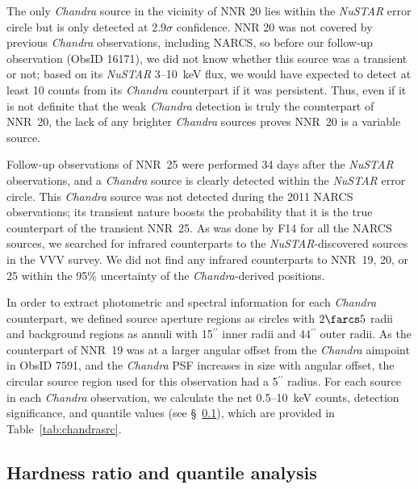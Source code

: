 \documentclass[iop,revtex4]{emulateapj}
\begin{document}
The only \textit{Chandra} source in the vicinity of NNR 20 lies within the \textit{NuSTAR} error circle but is only detected at 2.9$\sigma$ confidence.  NNR 20 was not covered by previous \textit{Chandra} observations, including NARCS, so before our follow-up observation (ObsID 16171), we did not know whether this source was a transient or not; based on its \textit{NuSTAR} 3--10~keV flux, we would have expected to detect at least 10 counts from its \textit{Chandra} counterpart if it was persistent.  Thus, even if it is not definite that the weak \textit{Chandra} detection is truly the counterpart of NNR~20, the lack of any brighter \textit{Chandra} sources proves NNR~20 is a variable source.  \par
Follow-up observations of NNR~25 were performed 34 days after the \textit{NuSTAR} observations, and a \textit{Chandra} source is clearly detected within the \textit{NuSTAR} error circle.  This \textit{Chandra} source was not detected during the 2011 NARCS observations; its transient nature boosts the probability that it is the true counterpart of the transient NNR~25.  As was done by F14 for all the NARCS sources, we searched for infrared counterparts to the \textit{NuSTAR}-discovered sources in the VVV survey.  We did not find any infrared counterparts to NNR~19, 20, or 25 within the 95\% uncertainty of the \textit{Chandra}-derived positions. \par
In order to extract photometric and spectral information for each \textit{Chandra} counterpart, we defined source aperture regions as circles with $2\farcs5$ radii and background regions as annuli with 15$^{\prime\prime}$ inner radii and 44$^{\prime\prime}$ outer radii.  As the counterpart of NNR~19 was at a larger angular offset from the \textit{Chandra} aimpoint in ObsID 7591, and the \textit{Chandra} PSF increases in size with angular offset, the circular source region used for this observation had a 5$^{\prime\prime}$ radius.  For each source in each \textit{Chandra} observation, we calculate the net 0.5--10~keV counts, detection significance, and quantile values (see \S~\ref{sec:quantile}), which are provided in Table~\ref{tab:chandrasrc}. 


\subsection{Hardness ratio and quantile analysis}
\label{sec:quantile}
\end{document}
